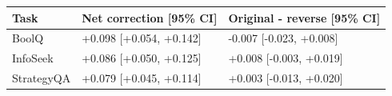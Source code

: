 \begin{tabular}{lll}
\toprule
Task & Net correction [95\% CI] & Original - reverse [95\% CI] \\
\midrule
BoolQ & +0.098 [+0.054, +0.142] & -0.007 [-0.023, +0.008] \\
InfoSeek & +0.086 [+0.050, +0.125] & +0.008 [-0.003, +0.019] \\
StrategyQA & +0.079 [+0.045, +0.114] & +0.003 [-0.013, +0.020] \\
\bottomrule
\end{tabular}
